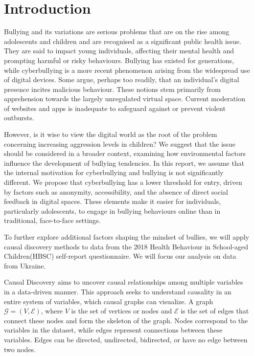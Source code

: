 \documentclass[main.tex]{subfiles}
\begin{document}
\section{Introduction}
Bullying and its variations are serious problems that are on the rise among adolescents and children \cite{Zhu2021} and are recognised as a significant public health issue. They are said to impact young individuals, affecting their mental health and prompting harmful or risky behaviours. Bullying has existed for generations, while cyberbullying is a more recent phenomenon arising from the widespread use of digital devices. Some argue, perhaps too readily, that an individual's digital presence incites malicious behaviour. These notions stem primarily from apprehension towards the largely unregulated virtual space. Current moderation of websites and apps is inadequate to safeguard against or prevent violent outbursts.

However, is it wise to view the digital world as the root of the problem concerning increasing aggression levels in children? We suggest that the issue should be considered in a broader context, examining how environmental factors influence the development of bullying tendencies. 
In this report, we assume that the internal motivation for cyberbullying and bullying is not significantly different. We propose that cyberbullying has a lower threshold for entry, driven by factors such as anonymity, accessibility, and the absence of direct social feedback in digital spaces. These elements make it easier for individuals, particularly adolescents, to engage in bullying behaviours online than in traditional, face-to-face settings. 

To further explore additional factors shaping the mindset of bullies, we will apply causal discovery methods to data from the 2018 Health Behaviour in School-aged Children(HBSC) self-report questionnaire. We will focus our analysis on data from  Ukraine. 

Causal Discovery aims to uncover causal relationships among multiple variables in a data-driven manner. This approach seeks to understand causality in an entire system of variables, which causal graphs can visualize. A graph \(\mathcal{G} = (V, \mathcal{E})\), where \(V\) is the set of vertices or nodes and \(\mathcal{E}\) is the set of edges that connect these nodes and form the skeleton of the graph. Nodes correspond to the variables in the dataset, while edges represent connections between these variables. Edges can be directed, undirected, bidirected, or have no edge between two nodes.
\end{document}
